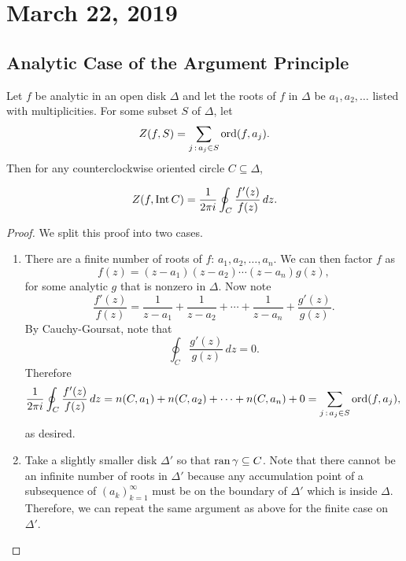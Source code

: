 \section{March 22, 2019}

\subsection{Analytic Case of the Argument Principle}

\begin{theorem}
    Let $f$ be analytic in an open disk $\Delta$ and let the
    roots of $f$ in $\Delta$ be $a_1, a_2, \ldots$ listed
    with multiplicities.
    For some subset $S$ of $\Delta$, let
    \[ Z(f, S) = \sum_{j \, : \, a_j \in S} \operatorname{ord} (f, a_j). \]
    Then for any counterclockwise oriented circle $C \subseteq
    \Delta$,

    \[ Z(f, \operatorname{Int}{C}) = \frac{1}{2\pi i} \oint_C \frac{f'(z)}{f(z)} \, dz. \]
\end{theorem}

\begin{proof}
    We split this proof into two cases.
    \begin{enumerate}
        \item There are a finite number of roots of $f$:
            $a_1, a_2, \ldots, a_n$.
            We can then factor $f$ as
            \[ f(z) = (z-a_1)(z-a_2) \cdots (z-a_n)g(z), \]
            for some analytic $g$ that is nonzero in $\Delta$.
            Now note
            \[ \frac{f'(z)}{f(z)} = \frac{1}{z - a_1} + 
                \frac{1}{z-a_2} + \cdots + \frac{1}{z-a_n} + 
                \frac{g'(z)}{g(z)}.
            \]
            By Cauchy-Goursat, note that
            \[ \oint_C \frac{g'(z)}{g(z)} \, dz = 0.\]
            Therefore
            \[ \frac{1}{2\pi i} \oint_C \frac{f'(z)}{f(z)} \, dz
                = n(C, a_1) + n(C, a_2) + \cdots + n(C, a_n) 
                + 0
                =\sum_{j \, : \, a_j \in S} \operatorname{ord} (f, a_j) ,
            \]
            as desired.
        \item Take a slightly smaller disk $\Delta'$ so that
            $\operatorname{ran} \gamma \subseteq C$.
            Note that there cannot be an infinite
            number of roots in $\Delta'$ because any
            accumulation point of a subsequence of ${(a_k)}_{k=1}^{\infty}$
            must be on the boundary of $\Delta'$ which is inside
            $\Delta$.
            Therefore, we can repeat the same argument as above
            for the finite case on $\Delta'$.
    \end{enumerate}
\end{proof}

